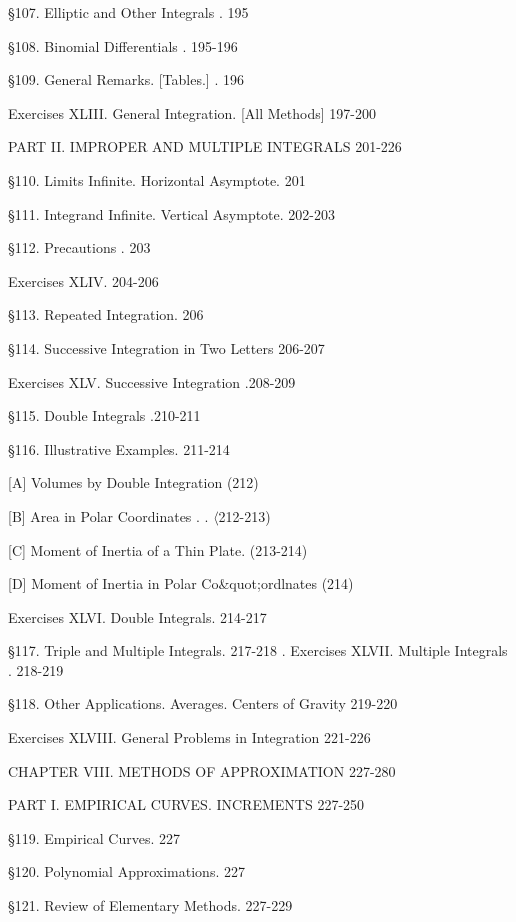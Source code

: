 \documentclass[12pt]{article}
\begin{document}
\S 107. Elliptic and Other Integrals . 195

\S 108. Binomial Differentials . 195-196


\S 109. General Remarks. [Tables.] . 196

Exercises XLIII. General Integration. [All Methods] 197-200

\begin{center}
PART II. IMPROPER AND MULTIPLE INTEGRALS 201-226
\end{center}

\S 110. Limits Infinite. Horizontal Asymptote. 201

\S 111. Integrand Infinite. Vertical Asymptote. 202-203

\S 112. Precautions . 203

Exercises XLIV. 204-206

\S 113. Repeated Integration. 206

\S 114. Successive Integration in Two Letters 206-207

Exercises XLV. Successive Integration .208-209

\S 115. Double Integrals .210-211

\S 116. Illustrative Examples. 211-214

[A] Volumes by Double Integration (212)

[B] Area in Polar Coordinates . . $\langle$212-213)

[C] Moment of Inertia of a Thin Plate. (213-214)

[D] Moment of Inertia in Polar Co\&quot;{o}rdlnates (214)

Exercises XLVI. Double Integrals. 214-217

\S 117. Triple and Multiple Integrals. 217-218
.
Exercises XLVII. Multiple Integrals . 218-219

\S 118. Other Applications. Averages. Centers of Gravity 219-220

Exercises XLVIII. General Problems in Integration 221-226

CHAPTER VIII. METHODS OF APPROXIMATION  227-280

\begin{center}
PART I. EMPIRICAL CURVES. INCREMENTS 227-250
\end{center}

\S 119. Empirical Curves. 227

\S 120. Polynomial Approximations. 227

\S 121. Review of Elementary Methods. 227-229
\end{document}
